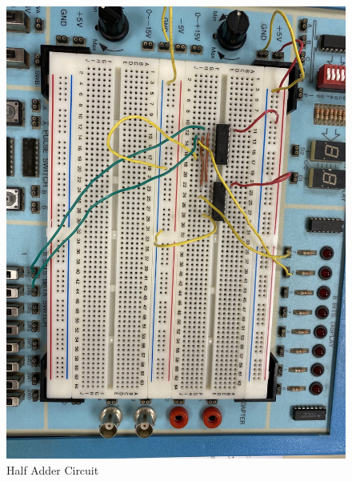 \documentclass[]{report}
\begin{document}
\begin{figure}[ht]
\centering
\includegraphics{HalfAdder.PNG}
\caption{Half Adder Circuit}
\label{fig:Half Adder}
\end{figure}
\end{document}

